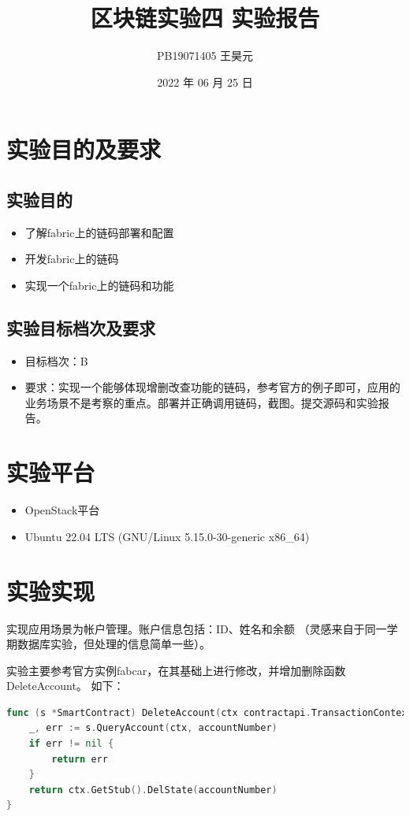 \documentclass{article}
\title{区块链实验四 实验报告}
\author{PB19071405 王昊元}
\date{2022 年 06 月 25 日}
\begin{document}
    \maketitle
    \section{实验目的及要求}
    \subsection{实验目的}
    \begin{itemize}
        \item 了解fabric上的链码部署和配置
        \item 开发fabric上的链码
        \item 实现一个fabric上的链码和功能
    \end{itemize}
    \subsection{实验目标档次及要求}
    \begin{itemize}
        \item 目标档次：B
        \item 要求：实现一个能够体现增删改查功能的链码，参考官方的例子即可，应用的业务场景不是考察的重点。部署并正确调用链码，截图。提交源码和实验报告。
    \end{itemize}
    \section{实验平台}
    \begin{itemize}
        \item OpenStack平台
        \item Ubuntu 22.04 LTS (GNU/Linux 5.15.0-30-generic x86\_64)
    \end{itemize}
    \section{实验实现}
    实现应用场景为帐户管理。账户信息包括：ID、姓名和余额
    （灵感来自于同一学期数据库实验，但处理的信息简单一些）。

    实验主要参考官方实例{\jetbrains fabcar}，在其基础上进行修改，并增加删除函数{\jetbrains DeleteAccount}。
    如下：
    \begin{lstlisting}[language=go]
func (s *SmartContract) DeleteAccount(ctx contractapi.TransactionContextInterface, accountNumber string) error {
	_, err := s.QueryAccount(ctx, accountNumber)
	if err != nil {
		return err
	}
	return ctx.GetStub().DelState(accountNumber)
}
    \end{lstlisting}
\end{document}
